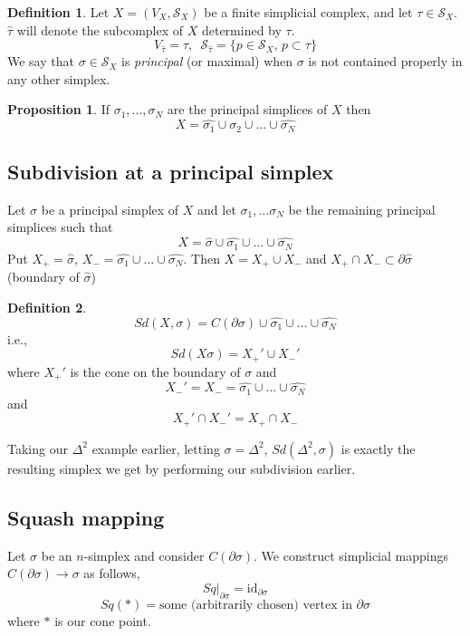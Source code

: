 \documentclass[a4paper,14pt]{extarticle}
\theoremstyle{definition}
\newtheorem*{definition}{Definition}
\newtheorem*{proposition}{Proposition}
\begin{document}
\begin{definition}
	Let $X=(V_X,\mathcal{S}_X)$ be a finite simplicial complex, and let $\tau\in\mathcal{S}_X$.
	$\hat{\tau}$ will denote the subcomplex of $X$ determined by $\tau$.
	\[V_{\hat{\tau}}=\tau, \,\,\,\mathcal{S}_{\hat{\tau}}=\{p\in\mathcal{S}_X, \,p\subset\tau\}\]
	We say that $\sigma\in\mathcal{S}_X$ is \emph{principal} (or maximal) when $\sigma$ is not
	contained properly in any other simplex.
\end{definition}

\begin{proposition}
	If $\sigma_1,\ldots,\sigma_N$ are the principal simplices of $X$ then 
	\[X=\hat{\sigma_1}\cup\hat{\sigma_2}\cup\ldots\cup\hat{\sigma_N}\]
\end{proposition}

\subsection{Subdivision at a principal simplex}
Let $\sigma$ be a principal simplex of $X$ and let $\sigma_1,\ldots\sigma_N$ be the remaining
principal simplices such that \[X=\hat{\sigma}\cup\hat{\sigma_1}\cup\ldots\cup\hat{\sigma_N}\]
Put $X_+=\hat{\sigma}$, $X_-=\hat{\sigma_1}\cup\ldots\cup\hat{\sigma_N}$. Then 
$X=X_+\cup X_-$ and $X_+\cap X_-\subset\partial\hat{\sigma}$ (boundary of $\hat{\sigma}$)

\begin{definition}
	\[Sd(X,\sigma)=C(\partial\sigma)\cup\hat{\sigma_1}\cup\ldots\cup\hat{\sigma_N}\] i.e.,
	\[Sd(X\sigma)=X_+'\cup X_-'\] where $X_+'$ is the cone on the boundary of $\sigma$ and
	\[X_-'=X_-=\hat{\sigma_1}\cup\ldots\cup\hat{\sigma_N}\] and \[X_+'\cap X_-'=X_+\cap X_-\]
\end{definition}

Taking our $\Delta^2$ example earlier, letting $\sigma=\Delta^2$, $Sd(\Delta^2,\sigma)$ is 
exactly the resulting simplex we get by performing our subdivision earlier.

\subsection{Squash mapping}
Let $\sigma$ be an $n$-simplex and consider $C(\partial\sigma)$. We construct simplicial mappings
$C(\partial\sigma)\rightarrow\sigma$ as follows,
\[Sq|_{\partial\sigma}=\text{id}_{\partial\sigma}\] \[Sq(*)=\text{some (arbitrarily chosen)
vertex in }\partial\sigma\] where $*$ is our cone point.
\end{document}
